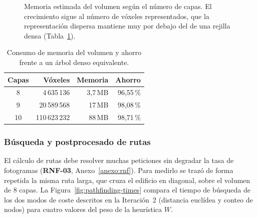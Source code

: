 \begin{figure}[htp]
  \centering
  \caption[Memoria estimada del volumen según el número de capas.]
  {Memoria estimada del volumen según el número de capas.
  El crecimiento sigue al número de vóxeles representados, que la representación dispersa mantiene muy por debajo del de una rejilla densa (Tabla~\ref{tab:memoria}).}
  \label{fig:memoria}
\end{figure}

\begin{table}[htp]
  \centering
  \begin{tabular}{c|r|r|r}
  \rowcolor{udcpink!25}
  \textbf{Capas} & \textbf{Vóxeles} & \textbf{Memoria} & \textbf{Ahorro} \\\hline
  8 & 4\,635\,136 & 3,7\,MB & 96,55\,\% \\
  9 & 20\,589\,568 & 17\,MB & 98,08\,\% \\
  10 & 110\,623\,232 & 88\,MB & 98,71\,\% \\
  \end{tabular}
  \caption{Consumo de memoria del volumen y ahorro frente a un árbol denso equivalente.}
  \label{tab:memoria}
\end{table}

\subsubsection{Búsqueda y postprocesado de rutas}

El cálculo de rutas debe resolver muchas peticiones sin degradar la tasa de fotogramas (\textbf{RNF-03}, Anexo~\ref{anexo:rnf}).
Para medirlo se trazó de forma repetida la misma ruta larga, que cruza el edificio en diagonal, sobre el volumen de 8 capas.
La Figura~\ref{fig:pathfinding-times} compara el tiempo de búsqueda de los dos modos de coste descritos en la Iteración~2 (distancia euclídea y conteo de nodos) para cuatro valores del peso de la heurística $W$.

